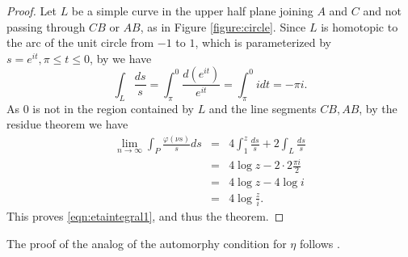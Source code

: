 \documentclass{article}
\begin{document}
\begin{proof}
Let $L$ be a simple curve in the upper half plane joining $A$ and $C$ and not passing through $CB$ or $AB$, as in Figure \ref{figure:circle}.
Since $L$ is homotopic to the arc of the unit circle from $-1$ to $1$, which is parameterized by
$s=e^{it}, \pi \leq t \leq 0$, by \cite[Chapter III, Theorem 5.1]{MR1659317} we have
\[
\int_L \frac{ds}{s}=\int_{\pi}^0 \frac{d(e^{it})}{e^{it}}=\int_{\pi}^0 i dt=-\pi i.
\]
As $0$ is not in the region contained by $L$ and the line segments $CB,AB$,
by the residue theorem we have
\begin{eqnarray*}
\lim_{n \to \infty} \int_P \frac{\varphi(\nu s)}{s}ds&=&4\int_1^z \frac{ds}{s}+2\int_L \frac{ds}{s}\\
&=&4\log z -2 \cdot 2 \frac{\pi i}{2}\\
&=&4\log z-4\log i\\
&=&4\log \frac{z}{i}.
\end{eqnarray*}
This proves \eqref{eqn:etaintegral1}, and thus the theorem.
\end{proof}

The proof of the analog of the automorphy condition for $\eta$ follows \cite[Chapter VIII, Theorem 3]{MR808396}.
\end{document}
